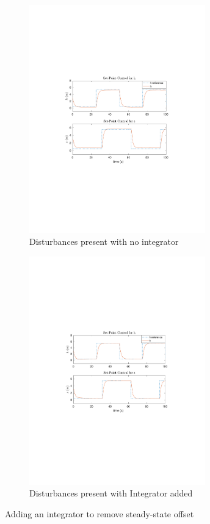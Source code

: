 \documentclass[dvips,12pt]{article}
\begin{document}
\begin{figure}[h]
\centering
\begin{subfigure}{.5\textwidth}
  \centering
  \includegraphics[trim = {4cm 8.5cm 4cm 8.5cm},clip,width=3in]{set_point_no_int.pdf}
  \caption{Disturbances present with no integrator}
  \label{fig:sub1}
\end{subfigure}%
\begin{subfigure}{.5\textwidth}
  \centering
  \includegraphics[trim = {4cm 8.5cm 4cm 8.5cm},clip,width=3in]{set_point_w_int.pdf}
  \caption{Disturbances present with Integrator added}
  \label{fig:sub2}
\end{subfigure}
\caption{Adding an integrator to remove steady-state offset}
\label{fig:integrator}
\end{figure}
\end{document}
